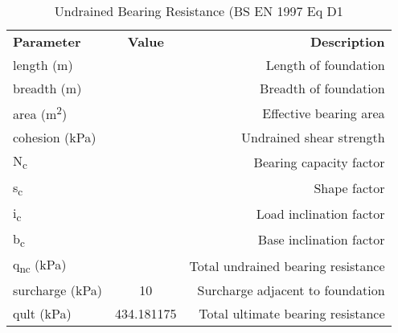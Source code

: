 \documentclass{article}
\begin{document}
	\begin{table}
		\begin{center}
			\caption{Undrained Bearing Resistance (BS EN 1997 Eq D1}
			\label{tab:table1}
			\begin{tabular}{l|c|r}
				\textbf{Parameter} & \textbf{Value} & \textbf{Description} \\
				length (m) & \length & Length of foundation \\
				breadth (m) & \breadth & Breadth of foundation \\
				area (m\textsuperscript{2}) & \area &  Effective bearing area \\
				cohesion (kPa) & \cu & Undrained shear strength \\
				N\textsubscript{c} & \nc & Bearing capacity factor \\
				s\textsubscript{c} & \sc & Shape factor \\
				i\textsubscript{c} & \ic & Load inclination factor \\
				b\textsubscript{c} & \bc & Base inclination factor \\
				q\textsubscript{nc} (kPa) & \qnc & Total undrained bearing resistance \\
				surcharge (kPa) & 10 & Surcharge adjacent to foundation \\
				qult (kPa) & 434.181175 & Total ultimate bearing resistance \\
			\end{tabular}
		\end{center}
	\end{table}
\end{document}
